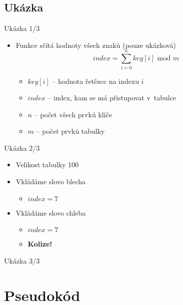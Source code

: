 \documentclass[14pt]{beamer}
\begin{document}
\subsection{Ukázka}
\begin{frame}{Ukázka 1/3}
\begin{itemize}
    \item Funkce sčítá hodnoty všech znaků (pouze ukázková)
    \begin{equation*}
        index = \sum_{i=0}^{n}key[i] \text{ mod } m
    \end{equation*}
    \begin{itemize}
        \item $key[i]$ -- hodnota řetězce na indexu $i$
        \item $index$ -- index, kam se má přistupovat v~tabulce
        \item $n$ -- počet všech prvků klíče
        \item $m$ -- počet prvků tabulky
    \end{itemize}
\end{itemize}
\end{frame}

\begin{frame}{Ukázka 2/3}
\begin{itemize}
    \item Velikost tabulky 100
    \item Vkládáme slovo blecha
    \begin{itemize}
        \item $index = 7$
    \end{itemize}
    \item Vkládáme slovo chleba
    \begin{itemize}
        \item $index = 7$
        \item \textbf{Kolize!}
    \end{itemize}
\end{itemize}
\end{frame}
\begin{frame}{Ukázka 3/3}
    \begin{figure}
        \centering
        
        \label{fig:my_label}
    \end{figure}
\end{frame}
\section{Pseudokód}
\end{document}
